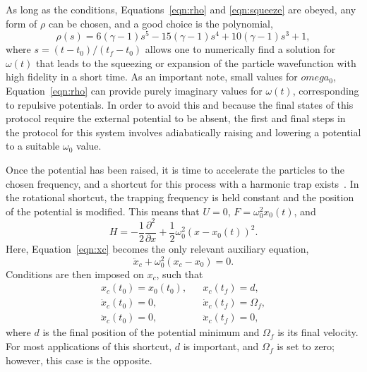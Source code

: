 As long as the conditions, Equations~\eqref{eqn:rho} and \eqref{eqn:squeeze} are obeyed, any form of $\rho$ can be chosen, and a good choice is the polynomial,
\begin{equation}
 \rho (s) = 6 \left(\gamma -1\right) s^5 -15 \left(\gamma-1\right) s^4 +10 \left(\gamma-1\right)s^3 + 1, \label{eq:rho_pol}
\end{equation}
\noindent where $s=(t-t_0)/(t_f-t_0)$ allows one to numerically find a solution for $\omega(t)$ that leads to the squeezing or expansion of the particle wavefunction with high fidelity in a short time.
As an important note, small values for $omega_0$, Equation~\eqref{eqn:rho} can provide purely imaginary values for $\omega(t)$, corresponding to repulsive potentials.
In order to avoid this and because the final states of this protocol require the external potential to be absent, the first and final steps in the protocol for this system involves adiabatically raising and lowering a potential to a suitable $\omega_0$ value. 

Once the potential has been raised, it is time to accelerate the particles to the chosen frequency, and a shortcut for this process with a harmonic trap exists~\cite{masuda2009,torrontegui2011,masuda2012}.
In the rotational shortcut, the trapping frequency is held constant and the position of the potential is modified.
This means that $U=0$, $F=\omega_0^2 x_0(t)$, and
\begin{equation}
 H= -\frac{1}{2} \frac{\partial^2}{\partial x}+ \frac 1 2 \omega^2_0 (x-x_0(t))^2.
\end{equation}
\noindent Here, Equation~\eqref{eqn:xc} becomes the only relevant auxiliary equation,
\begin{equation}
 \ddot{x}_c+\omega^2_0 (x_c-x_0)=0.
\end{equation}
Conditions are then imposed on $x_c$, such that
\begin{equation}
 \begin{array}{lcl}
x_c(t_0)=x_0(t_0), && x_c(t_f)=d,\\
\dot x_c(t_0)=0, && \dot x_c(t_f) =\Omega_f, \\
\ddot x_c(t_0)=0, && \ddot x_c(t_f)=0,
\end{array}
\end{equation}
\noindent where $d$ is the final position of the potential minimum and $\Omega_f$ is its final velocity. 
For most applications of this shortcut, $d$ is important, and $\Omega_f$ is set to zero; however, this case is the opposite.

